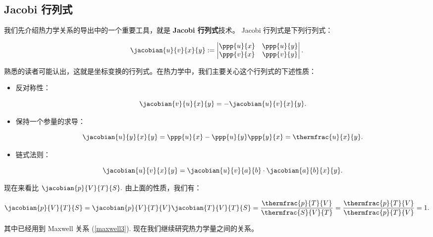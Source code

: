 \subsection{Jacobi 行列式}
我们先介绍热力学关系的导出中的一个重要工具，就是 \textbf{Jacobi 行列式}技术。 Jacobi 行列式是下列行列式：
\begin{linenomath}\begin{equation}
\jacobian{u}{v}{x}{y} := \left| \begin{matrix}
    \ppp{u}{x} & \ppp{u}{y} \\
    \ppp{v}{x} & \ppp{v}{y}
\end{matrix} \right|.
\end{equation}\end{linenomath}
熟悉的读者可能认出，这就是坐标变换的行列式。在热力学中，我们主要关心这个行列式的下述性质：
\begin{itemize}
    \item 反对称性：\begin{linenomath}\begin{equation}\jacobian{v}{u}{x}{y} = - \jacobian{u}{v}{x}{y}.\end{equation}\end{linenomath}
    \item 保持一个参量的求导：\begin{linenomath}\begin{equation}\jacobian{u}{y}{x}{y} = \ppp{u}{x} - \ppp{u}{y}\ppp{y}{x} =  \thermfrac{u}{x}{y}.\end{equation}\end{linenomath}
    \item 链式法则：\begin{linenomath}\begin{equation}\jacobian{u}{v}{x}{y} = \jacobian{u}{v}{a}{b}\cdot\jacobian{a}{b}{x}{y}.\end{equation}\end{linenomath}
\end{itemize}

现在来看比 $\jacobian{p}{V}{T}{S}.$ 由上面的性质，我们有：
\begin{linenomath}\begin{equation}
    \jacobian{p}{V}{T}{S} = \jacobian{p}{V}{T}{V}\jacobian{T}{V}{T}{S} = \frac{\thermfrac{p}{T}{V}}{\thermfrac{S}{V}{T}} = \frac{\thermfrac{p}{T}{V}}{\thermfrac{p}{T}{V}} = 1.
\end{equation}\end{linenomath}
其中已经用到 Maxwell 关系 (\ref{maxwell3}). 现在我们继续研究热力学量之间的关系。
